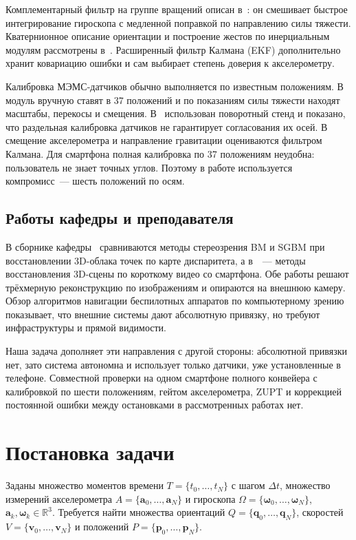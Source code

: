 \documentclass{misisarticle}
\begin{document}
Комплементарный фильтр на группе вращений описан в~\cite{mahony}: он смешивает быстрое интегрирование гироскопа с медленной поправкой по направлению силы тяжести. Кватернионное описание ориентации и построение жестов по инерциальным модулям рассмотрены в~\cite{zhilin}. Расширенный фильтр Калмана (EKF) дополнительно хранит ковариацию ошибки и сам выбирает степень доверия к акселерометру.

Калибровка МЭМС-датчиков обычно выполняется по известным положениям. В~\cite{tedaldi} модуль вручную ставят в 37 положений и по показаниям силы тяжести находят масштабы, перекосы и смещения. В~\cite{zhang} использован поворотный стенд и показано, что раздельная калибровка датчиков не гарантирует согласования их осей. В~\cite{batista} смещение акселерометра и направление гравитации оцениваются фильтром Калмана. Для смартфона полная калибровка по 37 положениям неудобна: пользователь не знает точных углов. Поэтому в работе используется компромисс~--- шесть положений по осям.

\subsection{Работы кафедры и преподавателя}

В сборнике кафедры~\cite{ermolenko} сравниваются методы стереозрения BM и SGBM при восстановлении 3D-облака точек по карте диспаритета, а в~\cite{privalov}~--- методы восстановления 3D-сцены по короткому видео со смартфона. Обе работы решают трёхмерную реконструкцию по изображениям и опираются на внешнюю камеру. Обзор алгоритмов навигации беспилотных аппаратов по компьютерному зрению~\cite{ali} показывает, что внешние системы дают абсолютную привязку, но требуют инфраструктуры и прямой видимости.

Наша задача дополняет эти направления с другой стороны: абсолютной привязки нет, зато система автономна и использует только датчики, уже установленные в телефоне. Совместной проверки на одном смартфоне полного конвейера с калибровкой по шести положениям, гейтом акселерометра, ZUPT и коррекцией постоянной ошибки между остановками в рассмотренных работах нет.

\section{Постановка задачи}

Заданы множество моментов времени $T=\{t_0,\dots,t_N\}$ с шагом $\Delta t$, множество измерений акселерометра $A=\{\mathbf a_0,\dots,\mathbf a_N\}$ и гироскопа $\Omega=\{\boldsymbol\omega_0,\dots,\boldsymbol\omega_N\}$, $\mathbf a_k,\boldsymbol\omega_k\in\mathbb R^3$. Требуется найти множества ориентаций $Q=\{\mathbf q_0,\dots,\mathbf q_N\}$, скоростей $V=\{\mathbf v_0,\dots,\mathbf v_N\}$ и положений $P=\{\mathbf p_0,\dots,\mathbf p_N\}$.
\end{document}
